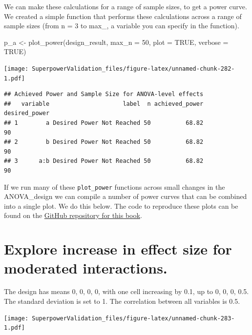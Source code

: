 \documentclass[
]{book}
\newenvironment{Shaded}{\begin{snugshade}}{\end{snugshade}}
\newcommand{\AttributeTok}[1]{\textcolor[rgb]{0.77,0.63,0.00}{#1}}
\newcommand{\ConstantTok}[1]{\textcolor[rgb]{0.00,0.00,0.00}{#1}}
\newcommand{\DecValTok}[1]{\textcolor[rgb]{0.00,0.00,0.81}{#1}}
\newcommand{\FunctionTok}[1]{\textcolor[rgb]{0.00,0.00,0.00}{#1}}
\newcommand{\NormalTok}[1]{#1}
\newcommand{\OtherTok}[1]{\textcolor[rgb]{0.56,0.35,0.01}{#1}}
\begin{document}
We can make these calculations for a range of sample sizes, to get a power curve. We created a simple function that performs these calculations across a range of sample sizes (from n = 3 to max\_, a variable you can specify in the function).

\begin{Shaded}
\begin{Highlighting}[]
\NormalTok{p\_a }\OtherTok{\textless{}{-}} \FunctionTok{plot\_power}\NormalTok{(design\_result,}
                  \AttributeTok{max\_n =} \DecValTok{50}\NormalTok{,}
                  \AttributeTok{plot =} \ConstantTok{TRUE}\NormalTok{,}
                  \AttributeTok{verbose =} \ConstantTok{TRUE}\NormalTok{)}
\end{Highlighting}
\end{Shaded}

\texttt{[image: SuperpowerValidation\_files/figure-latex/unnamed-chunk-282-1.pdf]}

\begin{verbatim}
## Achieved Power and Sample Size for ANOVA-level effects
##   variable                     label  n achieved_power desired_power
## 1        a Desired Power Not Reached 50          68.82            90
## 2        b Desired Power Not Reached 50          68.82            90
## 3      a:b Desired Power Not Reached 50          68.82            90
\end{verbatim}

If we run many of these \texttt{plot\_power} functions across small changes in the ANOVA\_design we can compile a number of power curves that can be combined into a single plot. We do this below. The code to reproduce these plots can be found on the \href{https://github.com/arcaldwell49/SuperpowerBook/tree/master/data}{GitHub repository for this book}.
\pagebreak

\hypertarget{explore-increase-in-effect-size-for-moderated-interactions.}{%
\section{Explore increase in effect size for moderated interactions.}\label{explore-increase-in-effect-size-for-moderated-interactions.}}

The design has means 0, 0, 0, 0, with one cell increasing by 0.1, up to 0, 0, 0, 0.5. The standard deviation is set to 1. The correlation between all variables is 0.5.

\texttt{[image: SuperpowerValidation\_files/figure-latex/unnamed-chunk-283-1.pdf]}
\end{document}

